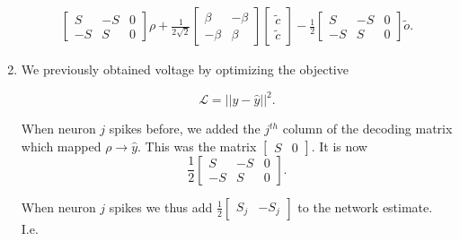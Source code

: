 \begin{enumerate}
\begin{align*}
\begin{bmatrix}
S & -S & 0
\\
-S & S & 0
\end{bmatrix} \rho
+
\frac{1}{2\sqrt{2}}
\begin{bmatrix}
\beta & -\beta
\\
-\beta & \beta
\end{bmatrix}
\begin{bmatrix}
\tilde{c}
\\
\tilde{c}
\end{bmatrix}
-
\frac{1}{2}\begin{bmatrix}
S & -S & 0
\\
-S & S & 0
\end{bmatrix} \tilde{o}.
\end{align*}

\item We previously obtained voltage by optimizing the objective

$$
\mathcal{L} = ||y - \hat{y}||^2. 
$$

When neuron $j$ spikes before, we added the $j^{th}$ column of the decoding matrix which mapped $\rho \to \hat{y}$. This was the matrix $\begin{bmatrix}S & 0 \end{bmatrix}$. It is now 
$$
\frac{1}{2} \begin{bmatrix}
S & -S & 0 
\\
-S & S & 0
\end{bmatrix}.
$$

When neuron $j$ spikes we thus add $\frac{1}{2}\begin{bmatrix} S_j & -S_j \end{bmatrix}$ to the network estimate. I.e.


\end{enumerate}
